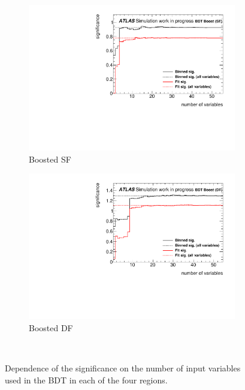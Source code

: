\begin{figure}[htb]
\begin{subfigure}[t]{0.49\textwidth}
        \includegraphics[width=\textwidth]{./plots/mva/variable_reduction/BOOST_SF_sig_vs_nvars_all.pdf}
        \caption{Boosted SF}
    \end{subfigure}
    \begin{subfigure}[t]{0.49\textwidth}
        \includegraphics[width=\textwidth]{./plots/mva/variable_reduction/BOOST_DF_sig_vs_nvars_all.pdf}
        \caption{Boosted DF}
    \end{subfigure}
    \caption{Dependence of the significance on the number of input variables used in the BDT in each of the four regions.}~\label{fig:mva:varopt:sig_vs_nvars}
\end{figure}

